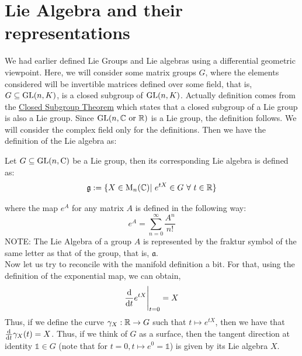 \section{Lie Algebra and their representations}
We had earlier defined Lie Groups and Lie algebras using a differential geometric viewpoint. Here, we will consider some matrix groups $G$, where the elements considered will be invertible matrices defined over some field, that is, 
$G \subseteq \mathrm{GL}(n,K)$, is a closed subgroup of $\mathrm{GL}(n,K)$. Actually definition comes from the \href{https://en.wikipedia.org/wiki/Closed-subgroup_theorem}{Closed Subgroup Theorem} which states that a closed subgroup of a Lie group is also a Lie group. Since $\GL(n,\ce \ \text{or}\ \re)$ is a Lie group, the definition follows. We will consider the complex field only for the definitions. Then we have the definition of the Lie algebra as:
\begin{definition}
    Let $G\subseteq \mathrm{GL}(n,\mathrm{C})$ be a Lie group, then its corresponding Lie algebra is defined as:
    $$\mathfrak{g} := \{X\in \Mn(\ce) | \ e^{tX}\in G\ \forall\ t \in \re\}$$
\end{definition}
where the map $e^{A}$ for any matrix $A$ is defined in the following way:
$$e^A = \sum\limits_{n=0}^\infty \frac{A^n}{n!}$$
NOTE: The Lie Algebra of a group $A$ is represented by the fraktur symbol of the same letter as that of the group, that is, $\mathfrak{a}$.\\[0.2cm]
Now let us try to reconcile with the manifold definition a bit. For that, using the definition of the exponential map, we can obtain, 
$$\dv{t} e^{tX}\Bigg|_{t=0} = X$$
Thus, if we define the curve $\gamma_X: \mathbb{R}\to G$ such that $t\mapsto e^{tX}$, then we have that $\dv{t} \gamma_X(t)=X$. Thus, if we think of $G$ as a surface, then the tangent direction at identity $\mathds{1}\in G$ (note that for $t=0, t\mapsto e^0 = \mathds{1}$) is given by its Lie algebra $X$. 

\begin{definition}
    
\end{definition}




